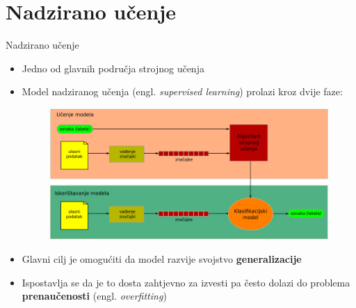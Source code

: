 \documentclass{beamer}
\begin{document}
\section{Nadzirano učenje}
	\begin{frame}{Nadzirano učenje}
		\begin{itemize}
			\pause
			\item Jedno od glavnih područja strojnog učenja
			\pause
			\item Model nadziranog učenja (engl. \textit{supervised learning}) prolazi kroz dvije faze:
			\bigskip
			\begin{figure}
			    \pause
			    \includegraphics[scale=0.35]{img/supervised-learning-flow.png}
		    \end{figure}
		    \bigskip
		    \pause
		    \item Glavni cilj je omogućiti da model razvije svojstvo \textbf{generalizacije}
		    \pause
		    \item Ispostavlja se da je to dosta zahtjevno za izvesti pa često dolazi do problema \textbf{prenaučenosti} (engl. \textit{overfitting})
		\end{itemize}
	\end{frame}
\end{document}
